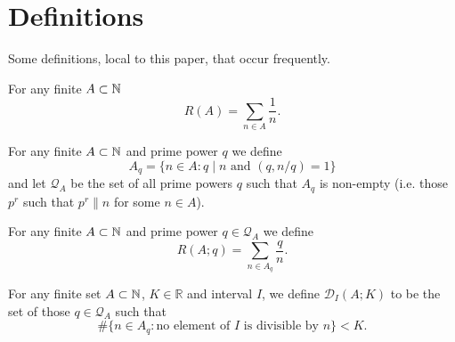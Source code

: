 \chapter{Definitions}
\label{chap:def}

Some definitions, local to this paper, that occur frequently. 

For any finite $A\subset \mathbb{N}$
\[R(A)=\sum_{n\in A}\frac{1}{n}.\]

For any finite $A\subset \mathbb{N}$ and prime power $q$ we define
\[A_q = \{ n\in A : q\mid n\textrm{ and }(q,n/q)=1\}\]
and let $\mathcal{Q}_A$ be the set of all prime powers $q$ such that $A_q$ is non-empty (i.e. those $p^r$ such that $p^r\| n$ for some $n\in A$). 


For any finite $A\subset \mathbb{N}$ and prime power $q\in\mathcal{Q}_A$ we define
\[R(A;q) = \sum_{n\in A_q}\frac{q}{n}.\]

For any finite set $A\subset \mathbb{N}$, $K\in \mathbb{R}$ and interval $I$, we define $\mathcal{D}_I(A;K)$ to be the set of those $q\in\mathcal{Q}_A$ such that
\[\#\{ n\in A_q: \textrm{no element of }I\textrm{ is divisible by }n\} < K.\]